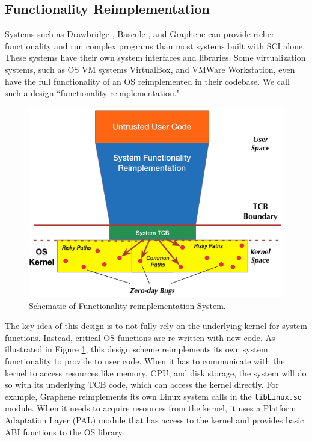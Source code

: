 \subsection{Functionality Reimplementation}
Systems such as  Drawbridge \cite{Drawbridge-11},
 Bascule \cite{Bascule}, and Graphene \cite{Graphene-14} can
provide richer functionality and run complex programs than most systems built
with SCI alone. These systems have their own system
interfaces and libraries. Some virtualization
systems, such as OS VM systems VirtualBox, and VMWare Workstation, even have the
full functionality of an OS reimplemented in their codebase. We call such a design
``functionality reimplementation."

\begin{figure}%
\centering
\includegraphics[width=1.0\columnwidth]{diagram/Virtualization_Design_Model_02.png}
\caption{\small Schematic of Functionality reimplementation System.}
\label{fig:design_functionality_reimplementation}
\end{figure}

The key idea of this design is to not fully rely on the underlying
kernel for system functions. Instead, critical OS functions are re-written with new
code. As illustrated in Figure \ref{fig:design_functionality_reimplementation},
 this design scheme reimplements its own system functionality to provide to user code.
 When it has to communicate with the kernel
to access resources like memory, CPU, and disk storage, the system will do so with
its underlying TCB code, which can access the kernel directly.
For example, Graphene \cite{Graphene-14} reimplements
its own Linux system calls in the
\texttt{libLinux.so} module. When it needs to acquire resources from
the kernel, it uses a
Platform Adaptation Layer (PAL)  module that has access to the kernel
and provides basic ABI functions to the OS library.

